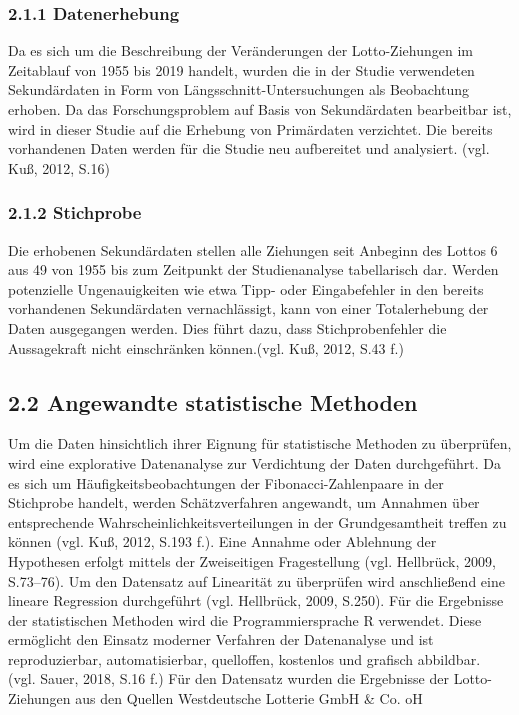 \documentclass[ngerman,]{article}
\begin{document}
\subsubsection{2.1.1 Datenerhebung}\label{datenerhebung}

Da es sich um die Beschreibung der Veränderungen der Lotto-Ziehungen im
Zeitablauf von 1955 bis 2019 handelt, wurden die in der Studie
verwendeten Sekundärdaten in Form von Längsschnitt-Untersuchungen als
Beobachtung erhoben. Da das Forschungsproblem auf Basis von
Sekundärdaten bearbeitbar ist, wird in dieser Studie auf die Erhebung
von Primärdaten verzichtet. Die bereits vorhandenen Daten werden für die
Studie neu aufbereitet und analysiert. (vgl. Kuß, 2012, S.16)

\subsubsection{2.1.2 Stichprobe}\label{stichprobe}

Die erhobenen Sekundärdaten stellen alle Ziehungen seit Anbeginn des
Lottos 6 aus 49 von 1955 bis zum Zeitpunkt der Studienanalyse
tabellarisch dar. Werden potenzielle Ungenauigkeiten wie etwa Tipp- oder
Eingabefehler in den bereits vorhandenen Sekundärdaten vernachlässigt,
kann von einer Totalerhebung der Daten ausgegangen werden. Dies führt
dazu, dass Stichprobenfehler die Aussagekraft nicht einschränken
können.(vgl. Kuß, 2012, S.43 f.)

\subsection{2.2 Angewandte statistische
Methoden}\label{angewandte-statistische-methoden}

Um die Daten hinsichtlich ihrer Eignung für statistische Methoden zu
überprüfen, wird eine explorative Datenanalyse zur Verdichtung der Daten
durchgeführt. Da es sich um Häufigkeitsbeobachtungen der
Fibonacci-Zahlenpaare in der Stichprobe handelt, werden Schätzverfahren
angewandt, um Annahmen über entsprechende
Wahrscheinlichkeitsverteilungen in der Grundgesamtheit treffen zu können
(vgl. Kuß, 2012, S.193 f.). Eine Annahme oder Ablehnung der Hypothesen
erfolgt mittels der Zweiseitigen Fragestellung (vgl. Hellbrück, 2009,
S.73--76). Um den Datensatz auf Linearität zu überprüfen wird
anschließend eine lineare Regression durchgeführt (vgl. Hellbrück, 2009,
S.250). Für die Ergebnisse der statistischen Methoden wird die
Programmiersprache R verwendet. Diese ermöglicht den Einsatz moderner
Verfahren der Datenanalyse und ist reproduzierbar, automatisierbar,
quelloffen, kostenlos und grafisch abbildbar. (vgl. Sauer, 2018, S.16
f.) Für den Datensatz wurden die Ergebnisse der Lotto-Ziehungen aus den
Quellen Westdeutsche Lotterie GmbH \& Co. oH
\end{document}
